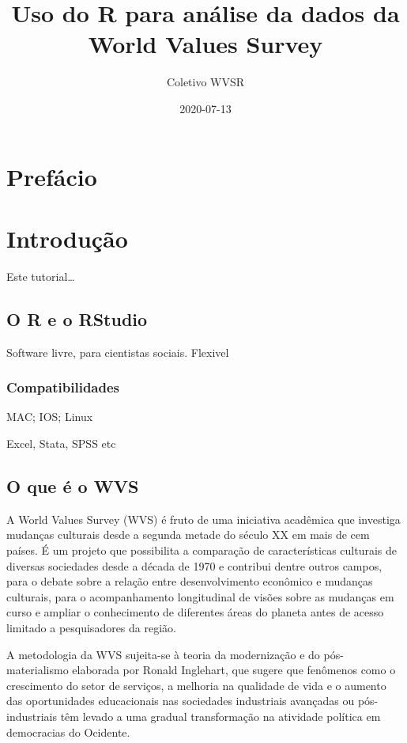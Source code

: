 \documentclass[
]{book}
\title{Uso do R para análise da dados da World Values Survey}
\author{Coletivo WVSR}
\date{2020-07-13}
\begin{document}
\maketitle

{
\setcounter{tocdepth}{1}
\tableofcontents
}
\hypertarget{prefuxe1cio}{%
\chapter{Prefácio}\label{prefuxe1cio}}

\hypertarget{intro}{%
\chapter{Introdução}\label{intro}}

Este tutorial\ldots{}

\hypertarget{o-r-e-o-rstudio}{%
\section{O R e o RStudio}\label{o-r-e-o-rstudio}}

Software livre, para cientistas sociais. Flexivel

\hypertarget{compatibilidades}{%
\subsection{Compatibilidades}\label{compatibilidades}}

MAC; IOS; Linux

Excel, Stata, SPSS etc

\hypertarget{o-que-uxe9-o-wvs}{%
\section{O que é o WVS}\label{o-que-uxe9-o-wvs}}

A World Values Survey (WVS) é fruto de uma iniciativa acadêmica que investiga mudanças culturais desde a segunda metade do século XX em mais de cem países. É um projeto que possibilita a comparação de características culturais de diversas sociedades desde a década de 1970 e contribui dentre outros campos, para o debate sobre a relação entre desenvolvimento econômico e mudanças culturais, para o acompanhamento longitudinal de visões sobre as mudanças em curso e ampliar o conhecimento de diferentes áreas do planeta antes de acesso limitado a pesquisadores da região.

A metodologia da WVS sujeita-se à teoria da modernização e do pós-materialismo elaborada por Ronald Inglehart, que sugere que fenômenos como o crescimento do setor de serviços, a melhoria na qualidade de vida e o aumento das oportunidades educacionais nas sociedades industriais avançadas ou pós-industriais têm levado a uma gradual transformação na atividade política em democracias do Ocidente.
\end{document}
